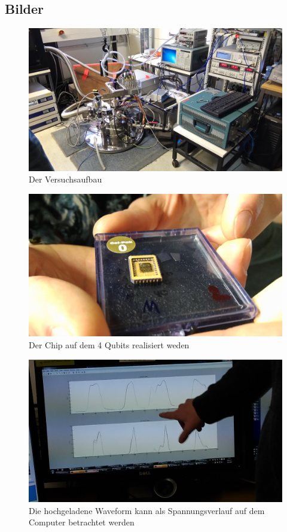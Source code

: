 \documentclass[DIN, pagenumber=false, fontsize=11pt]{scrartcl}
\begin{document}
\subsection{ Bilder}
\begin{figure}[h]
\begin{center}
 \includegraphics[width=.75\textwidth]{pictures/P_20150225_142624.jpg} \qquad
 \caption{Der Versuchsaufbau}
\end{center}
\end{figure}

\begin{figure}[h]
\begin{center}
 \includegraphics[width=.75\textwidth]{pictures/P_20150225_142709.jpg} \qquad
 \caption{Der Chip auf dem 4 Qubits realisiert weden}
\end{center}
\end{figure}

\begin{figure}[h]
\begin{center}
 \includegraphics[width=\textwidth]{pictures/P_20150225_143702.jpg} \qquad
 \caption{Die hochgeladene Waveform kann als Spannungsverlauf auf dem Computer betrachtet werden}
\end{center}
\end{figure}
\end{document}
